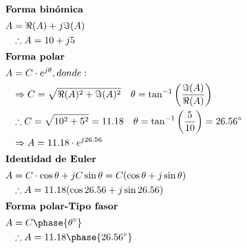 \documentclass[
	12pt, %
	fleqn, %
	a4paper, %
]{LegrandOrangeBook}
\begin{document}
\begin{align*}
\intertext{\textbf{Forma binómica}}
A&=\Re(A) + j\Im(A)\\
&\therefore A=10 + j5\\
\intertext{\textbf{Forma polar}}
A&=C\cdot e^{j\theta}, donde:\\
&\Rightarrow C=\sqrt{\Re(A)^2 + \Im(A)^2}\hspace{10pt}\theta=\tan^{-1}\left(\frac{\Im(A)}{\Re(A)}\right)\\
&\therefore C=\sqrt{10^2+5^2}=11.18\hspace{10pt}\theta=\tan^{-1}\left(\frac{5}{10}\right)=26.56^{\circ}\\
&\Rightarrow A=11.18\cdot e^{j 26.56}\\
\intertext{\textbf{Identidad de Euler}}
A&=C\cdot\cos\theta+jC\sin\theta=C(\cos\theta+j\sin\theta)\\
&\therefore A=11.18(\cos 26.56+j\sin 26.56)\\
\intertext{\textbf{Forma polar-Tipo fasor}}
A&=C\phase{\theta^{\circ}}\\
&\therefore A=11.18\phase{26.56^{\circ}}
\end{align*}
\end{document}
